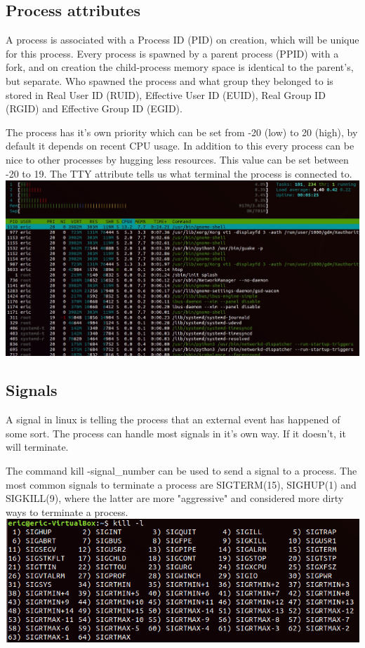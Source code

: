 \documentclass[12pt]{article}
\begin{document}
\subsection{Process attributes}
A process is associated with a Process ID (PID) on creation, which will be unique for this process. 
Every process is spawned by a parent process (PPID) with a fork, and on creation the child-process memory space is identical to the parent's, but separate.
Who spawned the process and what group they belonged to is stored in Real User ID (RUID), Effective User ID (EUID), Real Group ID (RGID) and Effective Group ID (EGID).

The process has it's own priority which can be set from -20 (low) to 20 (high), by default it depends on recent CPU usage. 
In addition to this every process can be nice to other processes by hugging less resources. This value can be set between -20 to 19.
The TTY attribute tells us what terminal the process is connected to.
\includegraphics[scale=0.5]{imgs/htop.jpg}

\subsection{Signals}
A signal in linux is telling the process that an external event has happened of some sort. 
The process can handle most signals in it's own way. If it doesn't, it will terminate.

The command kill -signal\_number can be used to send a signal to a process.
The most common signals to terminate a process are SIGTERM(15), SIGHUP(1) and SIGKILL(9), where the latter are more "aggressive" and considered more dirty ways to terminate a process.\\
\includegraphics[scale=0.7]{imgs/kill.png}
\end{document}
